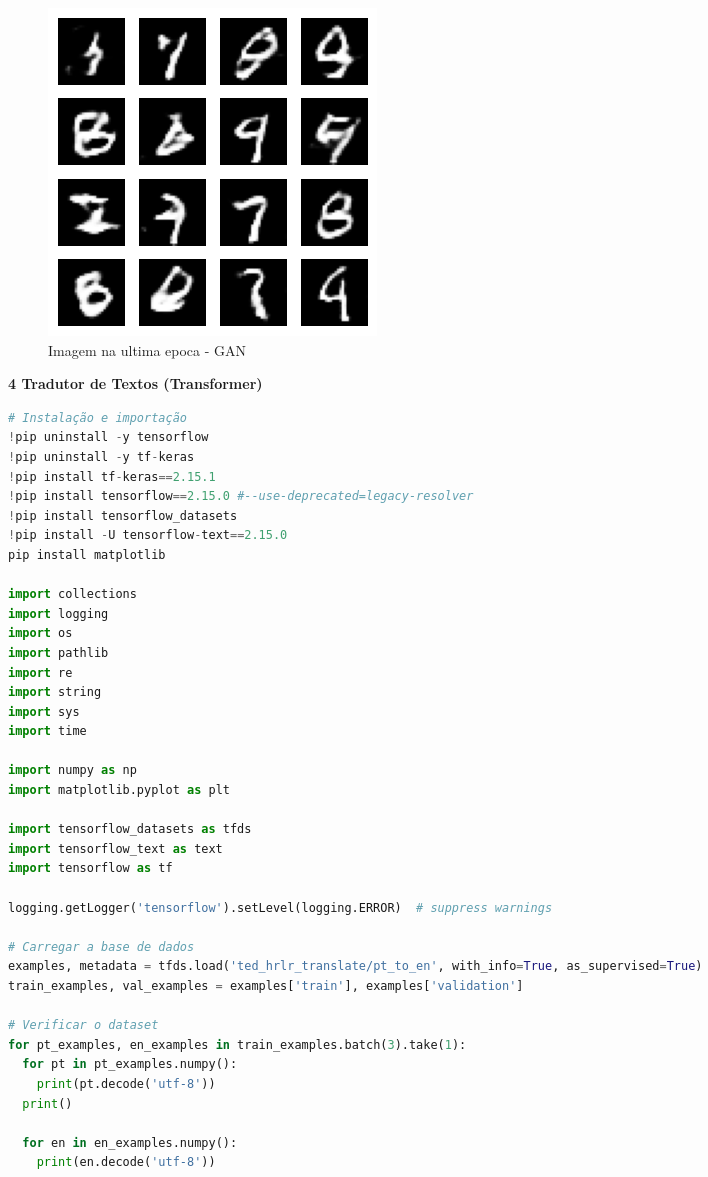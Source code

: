 \begin{figure}[H]
\centering
\includegraphics[width=.6\linewidth]{apendices/fig/9_IAA009_8.png}
\caption{Imagem na ultima epoca - GAN}
\end{figure}

\begin{adjustwidth}{1em}{}
\textbf{4 Tradutor de Textos (Transformer)}
\end{adjustwidth}


\begin{lstlisting}[language=Python, style=input]
# Instalação e importação
!pip uninstall -y tensorflow
!pip uninstall -y tf-keras
!pip install tf-keras==2.15.1
!pip install tensorflow==2.15.0 #--use-deprecated=legacy-resolver
!pip install tensorflow_datasets
!pip install -U tensorflow-text==2.15.0
pip install matplotlib

import collections
import logging
import os
import pathlib
import re
import string
import sys
import time

import numpy as np
import matplotlib.pyplot as plt

import tensorflow_datasets as tfds
import tensorflow_text as text
import tensorflow as tf

logging.getLogger('tensorflow').setLevel(logging.ERROR)  # suppress warnings

# Carregar a base de dados
examples, metadata = tfds.load('ted_hrlr_translate/pt_to_en', with_info=True, as_supervised=True)
train_examples, val_examples = examples['train'], examples['validation']

# Verificar o dataset
for pt_examples, en_examples in train_examples.batch(3).take(1):
  for pt in pt_examples.numpy():
    print(pt.decode('utf-8'))
  print()

  for en in en_examples.numpy():
    print(en.decode('utf-8'))
\end{lstlisting}

